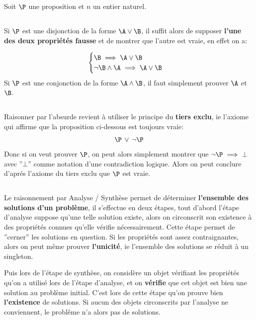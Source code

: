 \chapter*{}
Soit \(\P\) une proposition et \(n\) un entier naturel.

\section*{}
Si \(\P\) est une disjonction de la forme \(\A \lor \B\), il suffit alors de supposer \textbf{l'une des deux propriétés fausse} et de montrer que l'autre est vraie, en effet on a:

\[
   \begin{cases}
      \B \implies \A \lor \B \\
      \lnot \B \land \A \implies \A \lor \B&
   \end{cases} 
\]
Si \(\P\) est une conjonction de la forme \(\A \land \B\), il faut simplement prouver \(\A\) et \(\B\).
\section*{}
Raisonner par l'absurde revient à utiliser le principe du \textbf{tiers exclu}, ie l'axiome qui affirme que la proposition ci-dessous est toujours vraie:
\[
   \P \, \lor \, \lnot \P
\]
Donc si on veut prouver \(\P\), on peut alors simplement montrer que \(\lnot\P \implies \bot\) avec ''\(\bot\)'' comme notation d'une contradiction logique. Alors on peut conclure d'aprés l'axiome du tiers exclu que \(\P\) est vraie. 
\section*{}
Le raisonnement par Analyse / Synthèse permet de déterminer \textbf{l'ensemble des solutions d'un problème}, il s'effectue en deux étapes, tout d'abord l'étape d'analyse suppose qu'une telle solution existe, alors on circonscrit son existence à des propriétés connues qu'elle vérifie nécessairement. Cette étape permet de ''cerner'' les solutions en question. Si les propriétés sont assez contraignantes, alors on peut même prouver \textbf{l'unicité}, ie l'ensemble des solutions se réduit à un singleton.\<

Puis lors de l'étape de synthèse, on considère un objet vérifiant les propriétés qu'on a utilisé lors de l'étape d'analyse, et on \textbf{vérifie} que cet objet est bien une solution au problème initial. C'est lors de cette étape qu'on prouve bien \textbf{l'existence} de solutions. Si aucun des objets circonscrits par l'analyse ne conviennent, le problême n'a alors pas de solutions.

